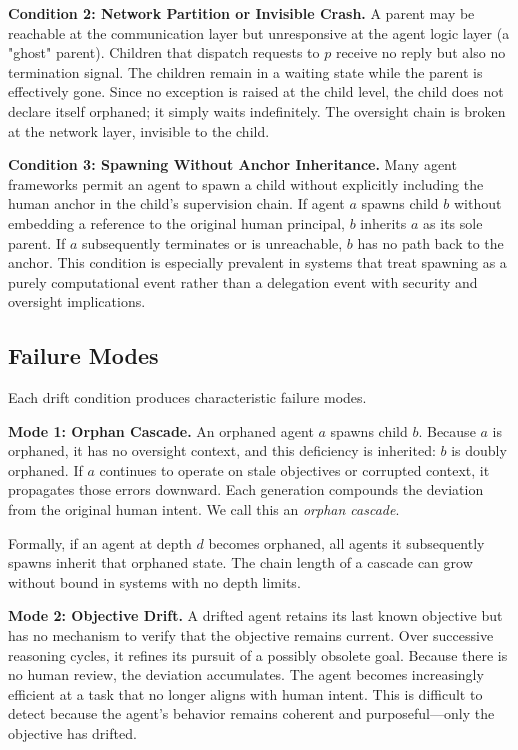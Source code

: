 \medskip\noindent\textbf{Condition 2: Network Partition or Invisible Crash.}
A parent may be reachable at the communication layer but unresponsive at the agent logic layer (a "ghost" parent). Children that dispatch requests to $p$ receive no reply but also no termination signal. The children remain in a waiting state while the parent is effectively gone. Since no exception is raised at the child level, the child does not declare itself orphaned; it simply waits indefinitely. The oversight chain is broken at the network layer, invisible to the child.

\medskip\noindent\textbf{Condition 3: Spawning Without Anchor Inheritance.}
Many agent frameworks permit an agent to spawn a child without explicitly including the human anchor in the child's supervision chain. If agent $a$ spawns child $b$ without embedding a reference to the original human principal, $b$ inherits $a$ as its sole parent. If $a$ subsequently terminates or is unreachable, $b$ has no path back to the anchor. This condition is especially prevalent in systems that treat spawning as a purely computational event rather than a delegation event with security and oversight implications.

\subsection{Failure Modes}

Each drift condition produces characteristic failure modes.

\medskip\noindent\textbf{Mode 1: Orphan Cascade.}
An orphaned agent $a$ spawns child $b$. Because $a$ is orphaned, it has no oversight context, and this deficiency is inherited: $b$ is doubly orphaned. If $a$ continues to operate on stale objectives or corrupted context, it propagates those errors downward. Each generation compounds the deviation from the original human intent. We call this an \emph{orphan cascade}.

Formally, if an agent at depth $d$ becomes orphaned, all agents it subsequently spawns inherit that orphaned state. The chain length of a cascade can grow without bound in systems with no depth limits.

\medskip\noindent\textbf{Mode 2: Objective Drift.}
A drifted agent retains its last known objective but has no mechanism to verify that the objective remains current. Over successive reasoning cycles, it refines its pursuit of a possibly obsolete goal. Because there is no human review, the deviation accumulates. The agent becomes increasingly efficient at a task that no longer aligns with human intent. This is difficult to detect because the agent's behavior remains coherent and purposeful—only the objective has drifted.

